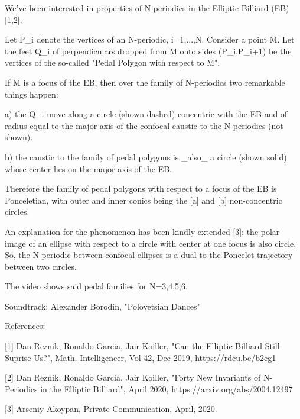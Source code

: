 We've been interested in properties of N-periodics in the Elliptic Billiard (EB) [1,2]. 

Let P_i denote the vertices of an N-periodic, i=1,...,N. Consider a point M. Let the feet Q_i of perpendiculars dropped from M onto sides (P_i,P_{i+1}) be the vertices of the so-called "Pedal Polygon with respect to M".

If M is a focus of the EB, then over the family of N-periodics two remarkable things happen:

a) the Q_i move along a circle (shown dashed) concentric with the EB and of radius equal to the major axis of the confocal caustic to the N-periodics (not shown).

b) the caustic to the family of pedal polygons is _also_ a circle (shown solid) whose center lies on the major axis of the EB.

Therefore the family of pedal polygons with respect to a focus of the EB is Ponceletian, with outer and inner conics being the [a] and [b] non-concentric circles.

An explanation for the phenomenon has been kindly extended [3]: the polar image of an ellipse with respect to a circle with center at one focus is also circle.  So, the N-periodic between confocal ellipses is a dual to the Poncelet trajectory between two circles.

The video shows said pedal families for N=3,4,5,6.

Soundtrack: Alexander Borodin, "Polovetsian Dances"

References:

[1] Dan Reznik, Ronaldo Garcia, Jair Koiller, "Can the Elliptic Billiard Still Suprise Us?", Math. Intelligencer, Vol 42, Dec 2019, https://rdcu.be/b2cg1

[2] Dan Reznik, Ronaldo Garcia, Jair Koiller, "Forty New Invariants of N-Periodics in the Elliptic Billiard", April 2020, https://arxiv.org/abs/2004.12497

[3] Arseniy Akoypan, Private Communication, April, 2020.